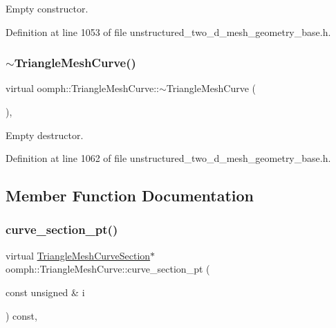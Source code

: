 Empty constructor. 



Definition at line 1053 of file unstructured\+\_\+two\+\_\+d\+\_\+mesh\+\_\+geometry\+\_\+base.\+h.

\mbox{\label{classoomph_1_1TriangleMeshCurve_aa7fc18e6612c6f82775c3320175acb45}} 
\subsubsection{\texorpdfstring{$\sim$\+Triangle\+Mesh\+Curve()}{~TriangleMeshCurve()}}
{\footnotesize\ttfamily virtual oomph\+::\+Triangle\+Mesh\+Curve\+::$\sim$\+Triangle\+Mesh\+Curve (\begin{DoxyParamCaption}{ }\end{DoxyParamCaption})\hspace{0.3cm}{\ttfamily [inline]}, {\ttfamily [virtual]}}



Empty destructor. 



Definition at line 1062 of file unstructured\+\_\+two\+\_\+d\+\_\+mesh\+\_\+geometry\+\_\+base.\+h.



\subsection{Member Function Documentation}
\mbox{\label{classoomph_1_1TriangleMeshCurve_a8a8d36c6b35f1bffd760877da4f3d52f}} 
\subsubsection{\texorpdfstring{curve\+\_\+section\+\_\+pt()}{curve\_section\_pt()}\hspace{0.1cm}{\footnotesize\ttfamily [1/2]}}
{\footnotesize\ttfamily virtual \hyperlink{classoomph_1_1TriangleMeshCurveSection}{Triangle\+Mesh\+Curve\+Section}$\ast$ oomph\+::\+Triangle\+Mesh\+Curve\+::curve\+\_\+section\+\_\+pt (\begin{DoxyParamCaption}\item[{const unsigned \&}]{i }\end{DoxyParamCaption}) const\hspace{0.3cm}{\ttfamily [inline]}, {\ttfamily [virtual]}}



